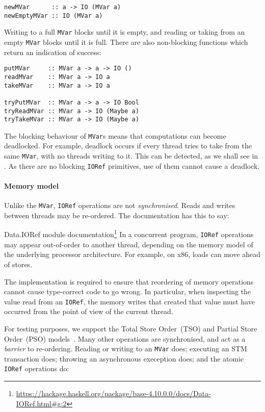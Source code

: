 \begin{verbatim}
newMVar      :: a -> IO (MVar a)
newEmptyMVar :: IO (MVar a)
\end{verbatim}

Writing to a full \verb|MVar| blocks until it is empty, and reading or taking
from an empty \verb|MVar| blocks until it is full.  There are also non-blocking
functions which return an indication of success:

\begin{verbatim}
putMVar     :: MVar a -> a -> IO ()
readMVar    :: MVar a -> IO a
takeMVar    :: MVar a -> IO a

tryPutMVar  :: MVar a -> a -> IO Bool
tryReadMVar :: MVar a -> IO (Maybe a)
tryTakeMVar :: MVar a -> IO (Maybe a)
\end{verbatim}

The blocking behaviour of \verb|MVar|s means that computations can
become deadlocked.  For example, deadlock occurs if every thread tries
to take from the same \verb|MVar|, with no threads writing to it.
This can be detected, as we shall see in .  As there
are no blocking \verb|IORef| primitives, use of them cannot cause a
deadlock.

\paragraph{Memory model}
Unlike the \verb|MVar|, \verb|IORef| operations are not
\emph{synchronised}.  Reads and writes between threads may be
re-ordered.  The documentation has this to say:

\begin{bquote}{Data.IORef module documentation\footnote{\url{https://hackage.haskell.org/package/base-4.10.0.0/docs/Data-IORef.html\#g:2}}}
  In a concurrent program, \verb|IORef| operations may appear out-of-order to
  another thread, depending on the memory model of the underlying processor
  architecture.  For example, on x86, loads can move ahead of stores.

  The implementation is required to ensure that reordering of memory operations
  cannot cause type-correct code to go wrong.  In particular, when inspecting
  the value read from an \verb|IORef|, the memory writes that created that value
  must have occurred from the point of view of the current thread.
\end{bquote}

For testing purposes, we support the Total Store Order~(TSO) and Partial Store
Order~(PSO) models~.  Many other operations are
synchronised, and act as a \emph{barrier} to re-ordering.  Reading or writing to
an \verb|MVar| does; executing an STM transaction does; throwing an asynchronous
exeception does; and the atomic \verb|IORef| operations do:

